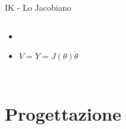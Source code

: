 \documentclass[10pt]{beamer}
\begin{document}
\begin{frame}[fragile]{IK - Lo Jacobiano}
{\begin{columns}[onlytextwidth]
{\begin{itemize}
          \item<3->
          \item<4-5>$V = \dot{Y} = J(\theta)\dot{\theta}$
        \end{itemize}
      }
    \end{columns}
  }
\end{frame}


\section{Progettazione}	%
\end{document}
